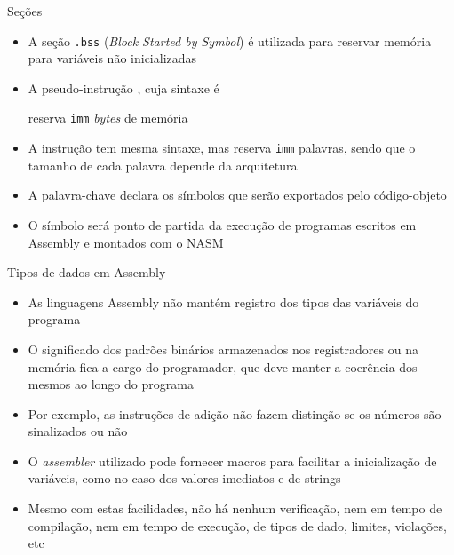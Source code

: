 \begin{frame}[fragile]{Seções}

    \begin{itemize}
        \item A seção \texttt{.bss} (\textit{Block Started by Symbol}) é utilizada para reservar
            memória para variáveis não inicializadas

        \item A pseudo-instrução , cuja sintaxe é


        reserva \texttt{imm} \textit{bytes} de memória

        \item A instrução  tem mesma sintaxe, mas reserva \texttt{imm} palavras,
            sendo que o tamanho de cada palavra depende da arquitetura

        \item A palavra-chave  declara os símbolos que serão exportados pelo
            código-objeto

        \item O símbolo  será ponto de partida da execução de programas
            escritos em Assembly e montados com o NASM
    \end{itemize}

\end{frame}

\begin{frame}[fragile]{Tipos de dados em Assembly}

    \begin{itemize}
        \item As linguagens Assembly não mantém registro dos tipos das variáveis do programa

        \item O significado dos padrões binários armazenados nos registradores ou na memória
            fica a cargo do programador, que deve manter a coerência dos mesmos ao longo do
            programa

        \item Por exemplo, as instruções de adição não fazem distinção se os números são
            sinalizados ou não

        \item O \textit{assembler} utilizado pode fornecer macros para facilitar a inicialização
            de variáveis, como no caso dos valores imediatos e de strings

        \item Mesmo com estas facilidades, não há nenhum verificação, nem em tempo de compilação,
            nem em tempo de execução, de tipos de dado, limites, violações, etc
    \end{itemize}

\end{frame}

